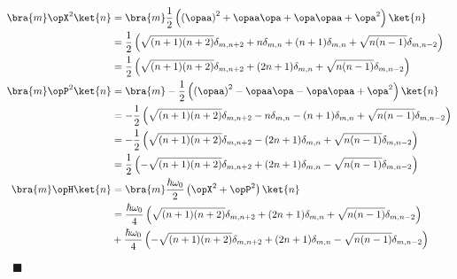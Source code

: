 \begin{align}
\bra{m}\opX^2\ket{n} &= \bra{m}\frac{1}{2}\left(\left(\opaa\right)^2 + \opaa\opa + \opa\opaa + \opa^2\right)\ket{n}\notag\\
&= \frac{1}{2}\left(\sqrt{(n+1)(n+2)}\delta_{m,n+2} + n\delta_{m,n} + (n+1)\delta_{m,n} + \sqrt{n(n-1)}\delta_{m,n-2}\right)\notag\\
&= \frac{1}{2}\left(\sqrt{(n+1)(n+2)}\delta_{m,n+2} + (2n+1)\delta_{m,n} + \sqrt{n(n-1)}\delta_{m,n-2}\right)\\
\bra{m}\opP^2\ket{n} &= \bra{m}-\frac{1}{2}\left(\left(\opaa\right)^2 - \opaa\opa - \opa\opaa + \opa^2\right)\ket{n}\notag\\
&= -\frac{1}{2}\left(\sqrt{(n+1)(n+2)}\delta_{m,n+2} - n\delta_{m,n} - (n+1)\delta_{m,n} + \sqrt{n(n-1)}\delta_{m,n-2}\right)\notag\\
&= -\frac{1}{2}\left(\sqrt{(n+1)(n+2)}\delta_{m,n+2} - (2n+1)\delta_{m,n} + \sqrt{n(n-1)}\delta_{m,n-2}\right)\notag\\
&= \frac{1}{2}\left(-\sqrt{(n+1)(n+2)}\delta_{m,n+2} + (2n+1)\delta_{m,n} - \sqrt{n(n-1)}\delta_{m,n-2}\right)\\
\bra{m}\opH\ket{n} &= \bra{m}\frac{\hbar\omega_0}{2}\left(\opX^2 + \opP^2\right)\ket{n}\notag\\
&= \frac{\hbar\omega_0}{4}\left(\sqrt{(n+1)(n+2)}\delta_{m,n+2} + (2n+1)\delta_{m,n} + \sqrt{n(n-1)}\delta_{m,n-2}\right)\notag\\
&+ \frac{\hbar\omega_0}{4}\left(-\sqrt{(n+1)(n+2)}\delta_{m,n+2} + (2n+1)\delta_{m,n} - \sqrt{n(n-1)}\delta_{m,n-2}\right)
\end{align}
~\hfill$\blacksquare$
